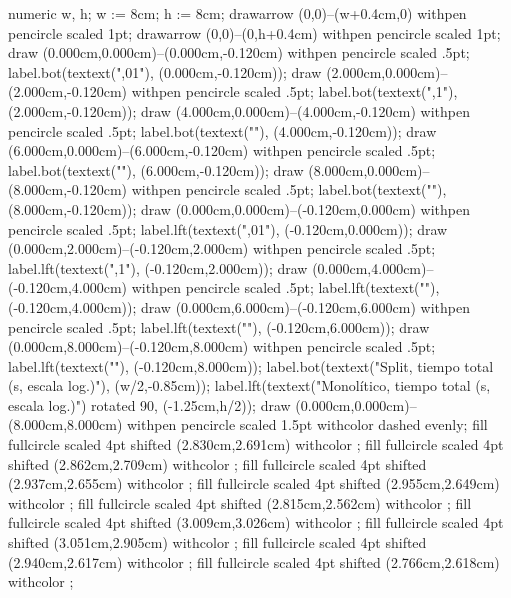 {\startMPcode
numeric w, h; w := 8cm; h := 8cm;
drawarrow (0,0)--(w+0.4cm,0) withpen pencircle scaled 1pt;
drawarrow (0,0)--(0,h+0.4cm) withpen pencircle scaled 1pt;
draw (0.000cm,0.000cm)--(0.000cm,-0.120cm) withpen pencircle scaled .5pt;
label.bot(textext(",01"), (0.000cm,-0.120cm));
draw (2.000cm,0.000cm)--(2.000cm,-0.120cm) withpen pencircle scaled .5pt;
label.bot(textext(",1"), (2.000cm,-0.120cm));
draw (4.000cm,0.000cm)--(4.000cm,-0.120cm) withpen pencircle scaled .5pt;
label.bot(textext(""), (4.000cm,-0.120cm));
draw (6.000cm,0.000cm)--(6.000cm,-0.120cm) withpen pencircle scaled .5pt;
label.bot(textext(""), (6.000cm,-0.120cm));
draw (8.000cm,0.000cm)--(8.000cm,-0.120cm) withpen pencircle scaled .5pt;
label.bot(textext(""), (8.000cm,-0.120cm));
draw (0.000cm,0.000cm)--(-0.120cm,0.000cm) withpen pencircle scaled .5pt;
label.lft(textext(",01"), (-0.120cm,0.000cm));
draw (0.000cm,2.000cm)--(-0.120cm,2.000cm) withpen pencircle scaled .5pt;
label.lft(textext(",1"), (-0.120cm,2.000cm));
draw (0.000cm,4.000cm)--(-0.120cm,4.000cm) withpen pencircle scaled .5pt;
label.lft(textext(""), (-0.120cm,4.000cm));
draw (0.000cm,6.000cm)--(-0.120cm,6.000cm) withpen pencircle scaled .5pt;
label.lft(textext(""), (-0.120cm,6.000cm));
draw (0.000cm,8.000cm)--(-0.120cm,8.000cm) withpen pencircle scaled .5pt;
label.lft(textext(""), (-0.120cm,8.000cm));
label.bot(textext("Split, tiempo total (s, escala log.)"), (w/2,-0.85cm));
label.lft(textext("Monolítico, tiempo total (s, escala log.)") rotated 90, (-1.25cm,h/2));
draw (0.000cm,0.000cm)--(8.000cm,8.000cm) withpen pencircle scaled 1.5pt withcolor  dashed evenly;
fill fullcircle scaled 4pt shifted (2.830cm,2.691cm) withcolor ;
fill fullcircle scaled 4pt shifted (2.862cm,2.709cm) withcolor ;
fill fullcircle scaled 4pt shifted (2.937cm,2.655cm) withcolor ;
fill fullcircle scaled 4pt shifted (2.955cm,2.649cm) withcolor ;
fill fullcircle scaled 4pt shifted (2.815cm,2.562cm) withcolor ;
fill fullcircle scaled 4pt shifted (3.009cm,3.026cm) withcolor ;
fill fullcircle scaled 4pt shifted (3.051cm,2.905cm) withcolor ;
fill fullcircle scaled 4pt shifted (2.940cm,2.617cm) withcolor ;
fill fullcircle scaled 4pt shifted (2.766cm,2.618cm) withcolor ;
}
